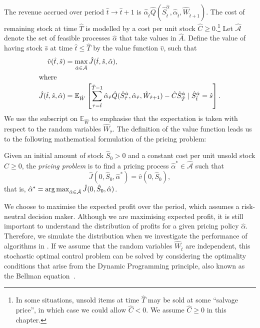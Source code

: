 \documentclass[main.tex]{subfiles}
\begin{document}
The revenue accrued over period $\hat{t}\to \hat{t}+1$ is
$\hat{\alpha}_{\hat{t}}\hat{Q}(\hat{S}_{\hat{t}}^{\hat{\alpha}},\hat{\alpha}_{\hat{t}},\hat{W}_{\hat{t}+1})$.
The cost of remaining stock at time $\hat{T}$ is modelled by a cost per unit
stock $\hat{C}\geq 0$.\footnote{In some situations, unsold items at time $\hat{T}$
  may be sold at some ``salvage price'', in which case we could allow
  $\hat{C}<0$. We assume $\hat{C}\geq 0$ in this chapter.}
Let $\hat{\mathcal{A}}$ denote the set of feasible processes $\hat{\alpha}$ that take values
in $\hat{A}$.
Define the value of having stock $\hat{s}$ at time $\hat{t}\leq \hat{T}$
by the value function $\hat{v}$, such that
\begin{align}\label{eq:value_function_def}
  \hat{v}(\hat{t},\hat{s})&=\max_{\hat{\alpha}\in\hat{\mathcal{A}}}
                            \hat{J}(\hat{t},\hat{s},\hat{\alpha}),\\
  \intertext{where}
  \hat{J}(\hat{t},\hat{s},\hat{\alpha})&=
                                         \mathbb{E}_{\hat{W}}\left[ \sum_{\hat{\tau}=\hat{t}}^{\hat{T}-1}
                                         \hat{\alpha}_{\hat{\tau}} \hat{Q}(\hat{S}_{\hat{\tau}}^{\hat{\alpha}},\hat{\alpha}_{\hat{\tau}},\hat{W}_{\hat{\tau}+1})
                                         - \hat{C}\hat{S}_{\hat{T}}^{\hat{\alpha}} \mid \hat{S}_{\hat{t}}^{\hat{\alpha}} = \hat{s}
                                         \right].
                                         \label{eq:value_function_def2}
\end{align}
We use the subscript on $\mathbb{E}_{\hat{W}}$ to emphasise that the
expectation is taken with respect to the random variables $\hat{W}_{\hat{\tau}}$.
The definition of the value function leads us to the following mathematical formulation of the pricing
problem:
\begin{mydef}
  Given an initial amount of stock $\hat{S}_0>0$ and a constant cost
  per unit unsold stock $\hat{C}\geq 0$, the \emph{pricing problem} is
  to find a pricing process $\hat{\alpha}^*\in\hat{\mathcal{A}}$ such
  that
  \begin{equation}
    \hat{J}(0,\hat{S}_0,\hat{\alpha}^*) = \hat{v}(0,\hat{S}_0),
  \end{equation}
  that is, $\hat{\alpha}^* = \operatorname*{arg\,max}_{\hat{\alpha}\in\hat{\mathcal{A}}}\hat{J}(0,\hat{S}_0,\hat{\alpha})$.
\end{mydef}
We choose to maximise the expected profit over the period, which
assumes a risk-neutral decision maker.
Although we are maximising expected profit, it is still important
to understand the distribution of profits for a given pricing policy
$\hat{\alpha}$. Therefore, we simulate the distribution when
we investigate the performance of algorithms in
.
If we assume that the random variables $\hat{W}_{\hat{t}}$ are independent, this
stochastic optimal control problem can be solved by
considering the optimality conditions that arise from the Dynamic
Programming principle, also known as the Bellman equation~\citep{bertsekas2005dynamic}.
\end{document}
